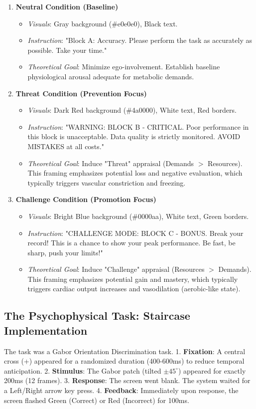 \documentclass[journal]{IEEEtran}
\begin{document}
\begin{enumerate}
    \item \textbf{Neutral Condition (Baseline)}
    \begin{itemize}
        \item \textit{Visuals}: Gray background (\#e0e0e0), Black text.
        \item \textit{Instruction}: "Block A: Accuracy. Please perform the task as accurately as possible. Take your time."
        \item \textit{Theoretical Goal}: Minimize ego-involvement. Establish baseline physiological arousal adequate for metabolic demands.
    \end{itemize}

    \item \textbf{Threat Condition (Prevention Focus)}
    \begin{itemize}
        \item \textit{Visuals}: Dark Red background (\#4a0000), White text, Red borders.
        \item \textit{Instruction}: "WARNING: BLOCK B - CRITICAL. Poor performance in this block is unacceptable. Data quality is strictly monitored. AVOID MISTAKES at all costs."
        \item \textit{Theoretical Goal}: Induce "Threat" appraisal (Demands $>$ Resources). This framing emphasizes potential loss and negative evaluation, which typically triggers vascular constriction and freezing.
    \end{itemize}

    \item \textbf{Challenge Condition (Promotion Focus)}
    \begin{itemize}
        \item \textit{Visuals}: Bright Blue background (\#0000aa), White text, Green borders.
        \item \textit{Instruction}: "CHALLENGE MODE: BLOCK C - BONUS. Break your record! This is a chance to show your peak performance. Be fast, be sharp, push your limits!"
        \item \textit{Theoretical Goal}: Induce "Challenge" appraisal (Resources $>$ Demands). This framing emphasizes potential gain and mastery, which typically triggers cardiac output increases and vasodilation (aerobic-like state).
    \end{itemize}
\end{enumerate}

\subsection{The Psychophysical Task: Staircase Implementation}
The task was a Gabor Orientation Discrimination task.
1. \textbf{Fixation}: A central cross (+) appeared for a randomized duration (400-600ms) to reduce temporal anticipation.
2. \textbf{Stimulus}: The Gabor patch (tilted $\pm 45^\circ$) appeared for exactly 200ms (12 frames).
3. \textbf{Response}: The screen went blank. The system waited for a Left/Right arrow key press.
4. \textbf{Feedback}: Immediately upon response, the screen flashed Green (Correct) or Red (Incorrect) for 100ms.
\end{document}
